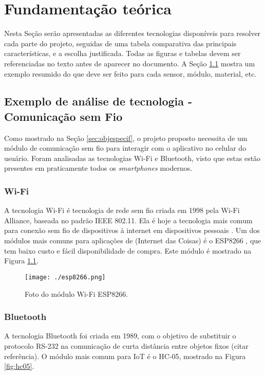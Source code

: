 \chapter{Fundamentação teórica}

Nesta Seção serão apresentadas as diferentes tecnologias disponíveis para resolver cada parte do projeto, seguidas de uma tabela comparativa das principais características, e a escolha justificada. Todas as figuras e tabelas devem ser referenciadas no texto antes de aparecer no documento. A Seção \ref{sec:exemplo} mostra um exemplo resumido do que deve ser feito para cada sensor, módulo, material, etc.

\section{Exemplo de análise de tecnologia - Comunicação sem Fio}
\label{sec:exemplo}
Como mostrado na Seção \ref{sec:objespecif}, o projeto proposto necessita de um módulo de comunicação sem fio para interagir com o aplicativo no celular do usuário. Foram analisadas as tecnologias Wi-Fi e Bluetooth, visto que estas estão presentes em praticamente todos os \textit{smartphones} modernos.

\subsection{Wi-Fi}
\label{sec:wifi}

A tecnologia Wi-Fi é tecnologia de rede sem fio criada em 1998 pela Wi-Fi Alliance, baseada no padrão IEEE 802.11. Ela é hoje a tecnologia mais comum para conexão sem fio de dispositivos à internet em dispositivos pessoais \cite{WiFi2020}. Um dos módulos mais comuns para aplicações de  (Internet das Coisas) é o ESP8266 \cite{datasheet8266}, que tem baixo custo e fácil disponibilidade de compra. Este módulo é mostrado na Figura \ref{fig:esp8266}.

\begin{figure}[!htb]
	\centering
	\texttt{[image: ./esp8266.png]} 
	\caption{Foto do módulo Wi-Fi ESP8266.}
	\label{fig:esp8266}
\end{figure}

\subsection{Bluetooth}
\label{sec:bt}
A tecnologia Bluetooth foi criada em 1989, com o objetivo de substituir o protocolo RS-232 na comunicação de curta distância entre objetos fixos (citar referência). O módulo mais comum para IoT é o HC-05, mostrado na Figura \ref{fig:hc05}.


